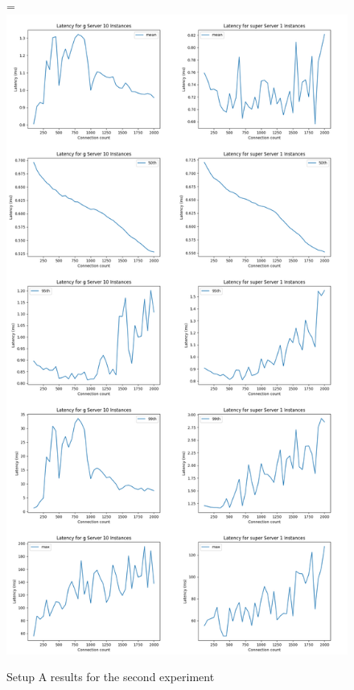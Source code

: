 \documentclass[12pt,oneandhalf,chaparabic,ceng,ms,eng,oneside,pntc]{gsufbe}
\makeatletter
\let\old@includegraphics\includegraphics
\renewcommand{\includegraphics}[2][,]{%
  \setbox9=\hbox{\old@includegraphics[#1]{#2}}%
  \ifdim\wd9>\textwidth
    \old@includegraphics[#1,width=\textwidth]{#2}%
  \else
    \old@includegraphics[#1]{#2}%
  \fi%
}
\makeatother
\begin{document}
\begin{figure}
\centering
\includegraphics[]{1vs10.png}
\caption{Setup A results for the second experiment}
\label{fig:1vs5}
\end{figure}
\end{document}
